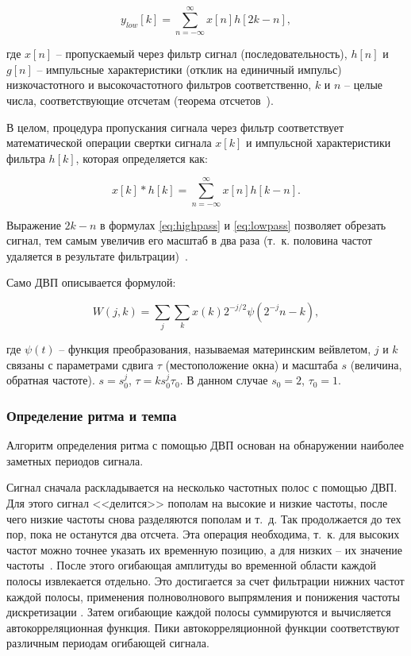 \begin{equation}\label{eq:lowpass}
	y_{low}[k] = \sum_{n=-\infty}^{\infty} x[n] h[2k-n],
\end{equation}

где $x[n]$ -- пропускаемый через фильтр сигнал (последовательность), $h[n]$ и $g[n]$ -- импульсные характеристики (отклик на единичный импульс) низкочастотного и высокочастотного фильтров соответственно, $k$ и $n$ -- целые числа, соответствующие отсчетам (теорема отсчетов~\cite{samples}).

В целом, процедура пропускания сигнала через фильтр соответствует математической операции свертки сигнала $x[k]$ и импульсной характеристики фильтра $h[k]$, которая определяется как:

\begin{equation}\label{eq:conv}
	x[k]*h[k] = \sum_{n=-\infty}^{\infty} x[n] h[k-n].
\end{equation}

Выражение $2k-n$ в формулах \ref{eq:highpass} и \ref{eq:lowpass} позволяет обрезать сигнал, тем самым увеличив его масштаб в два раза (т.~к. половина частот удаляется в результате фильтрации)~\cite{polikar}.

Само ДВП описывается формулой:

\begin{equation}\label{eq:dwt}
	W(j, k) = \sum_{j}\sum_{k} x(k) 2^{-j/2} \psi(2^{-j}n-k),
\end{equation}

где $\psi(t)$ -- функция преобразования, называемая материнским вейвлетом, $j$ и $k$ связаны с параметрами сдвига $\tau$ (местоположение окна) и масштаба $s$ (величина, обратная частоте). $s = s_0^j$, $\tau = k s_0^j \tau_0$. В данном случае $s_0 = 2$, $\tau_0 = 1$.

\subsubsection{Определение ритма и темпа}

Алгоритм определения ритма с помощью ДВП основан на обнаружении наиболее заметных периодов сигнала.

Сигнал сначала раскладывается на несколько частотных полос с помощью ДВП. Для этого сигнал <<делится>> пополам на высокие и низкие частоты, после чего низкие частоты снова разделяются пополам и т.~д. Так продолжается до тех пор, пока не останутся два отсчета. Эта операция необходима, т.~к. для высоких частот можно точнее указать их временную позицию, а для низких -- их значение частоты~\cite{polikar}. После этого огибающая амплитуды во временной области каждой полосы извлекается отдельно. Это достигается за счет фильтрации нижних частот каждой полосы, применения полноволнового выпрямления и понижения частоты дискретизации \cite{dwt}. Затем огибающие каждой полосы суммируются и вычисляется автокорреляционная функция. Пики автокорреляционной функции соответствуют различным периодам огибающей сигнала.

